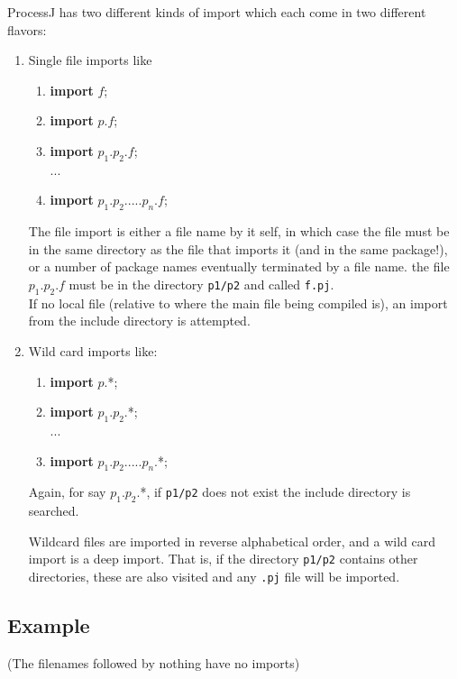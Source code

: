 \documentclass[pdflatex,11pt,letter]{article}
\begin{document}
ProcessJ has two different kinds of import which each come in two different
flavors:

\begin{enumerate}
\item Single file imports like
  \begin{enumerate}
    \item {\bf import} $f$;
    \item {\bf import} $p$.$f$;
    \item {\bf import} $p_1$.$p_2$.$f$;\\
      ...
    \item {\bf import} $p_1$.$p_2$.$...$.$p_n$.$f$;
    \end{enumerate}
    The file import is either a file name by it self, in which case the file
    must be in the same directory as the file that imports it (and in the same
    package!), or a number of package names eventually terminated by a file name.
    the file $p_1$.$p_2$.$f$ must be in the directory {\tt p1/p2} and
    called {\tt f.pj}.\\

    If no local file (relative to where the main file being compiled is), an import
    from the include directory is attempted.
\item Wild card imports like:
  \begin{enumerate}
    \item {\bf import} $p$.*;
    \item {\bf import} $p_1$.$p_2$.*;\\
       ...
    \item {\bf import} $p_1$.$p_2$.$...$.$p_n$.*;
    \end{enumerate}
    Again, for say $p_1$.$p_2$.*, if {\tt p1/p2} does not exist the include directory is searched.

    Wildcard files are imported in reverse alphabetical order, and a
    wild card import is a deep import. That is, if the directory {\tt p1/p2}
    contains other directories, these are also visited and any {\tt .pj}
    file will be imported.
\end{enumerate}


\subsection{Example}

(The filenames followed by nothing have no imports)
\end{document}
